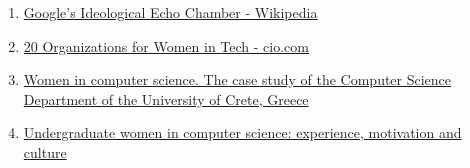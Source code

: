 \documentclass[12pt]{article}
\begin{document}
\begin{enumerate}
  \item
  \href{https://en.wikipedia.org/wiki/Google%27s_Ideological_Echo_Chamber#Cultural_commentary}{Google's Ideological Echo Chamber - Wikipedia}
  \item
  \href{https://www.cio.com/article/215709/16-organizations-for-women-in-tech.html}{20 Organizations for Women in Tech - cio.com}
  \item
  \href{https://www.inderscienceonline.com/doi/pdf/10.1504/IJTCS.2018.090963}{Women in computer science. The case study of the Computer Science Department of the University of Crete, Greece}
  \item
  \href{https://dl.acm.org/doi/abs/10.1145/268085.268127}{Undergraduate women in computer science: experience, motivation and culture}
  
  \end{enumerate}
\end{document}
